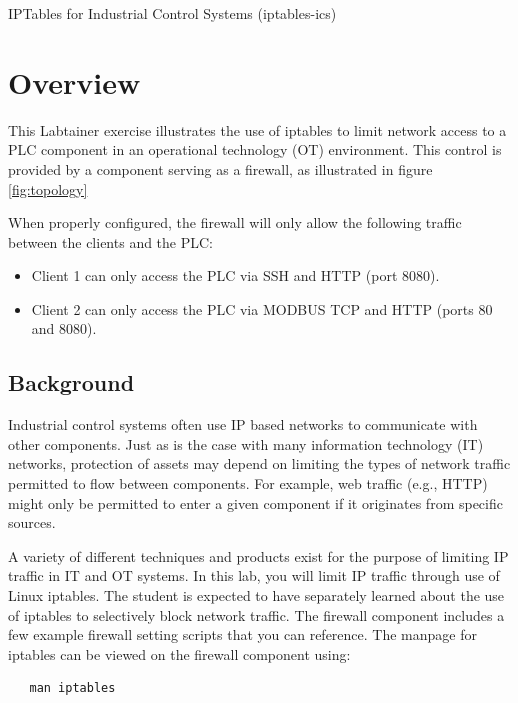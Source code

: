 


\begin{center}
{\LARGE IPTables for Industrial Control Systems (iptables-ics)}
\vspace{0.1in}\\
\end{center}


\section{Overview}
This Labtainer exercise illustrates the use of iptables
to limit network access to a PLC component in an operational
technology (OT) environment. This control is provided by 
a component serving as a firewall, as illustrated in figure 
\ref{fig:topology}

When properly configured, the firewall will only allow the following traffic
between the clients and the PLC:
\begin{itemize}
\item Client 1 can only access the PLC via SSH and HTTP (port 8080).
\item Client 2 can only access the PLC via MODBUS TCP and HTTP (ports 80 and 8080).
\end{itemize}

\subsection {Background}
Industrial control systems often use IP based networks to communicate with
other components.  Just as is the case with many information technology (IT) networks,
protection of assets may depend on limiting the types of network traffic 
permitted to flow between components.  For example, web traffic (e.g., HTTP)
might only be permitted to enter a given component if it originates from specific
sources.

A variety of different techniques and products exist for the purpose of limiting
IP traffic in IT and OT systems.  In this lab, you will limit IP traffic through
use of Linux iptables.  
The student is expected to have separately learned about the use of iptables
to selectively block network traffic. The firewall component includes a few
example firewall setting scripts that you can reference.  The manpage for iptables can be viewed on the
firewall component using:
\begin{verbatim}
   man iptables
\end{verbatim}

